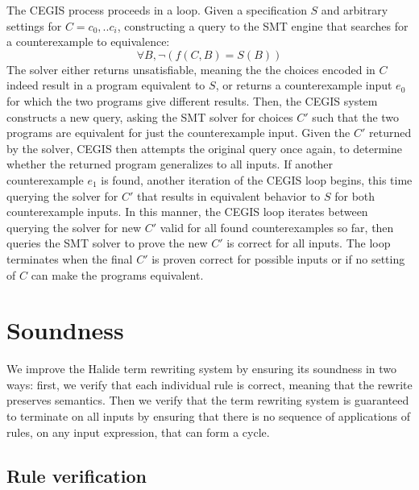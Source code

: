 \documentclass[sigplan,10pt,review,anonymous]{acmart}\settopmatter{printfolios=true,printccs=false,printacmref=false}
\begin{document}
The CEGIS process proceeds in a loop. Given a specification $S$ and arbitrary
settings for $C = {c_0,..c_i}$, constructing a query to the SMT engine that searches for
a counterexample to equivalence:
$$\forall B, \neg (f(C, B) = S(B))$$
The solver either returns unsatisfiable, meaning the the choices encoded in $C$
indeed result in a program equivalent to $S$, or returns a counterexample input $e_0$
for which the two programs give different results.  Then, the CEGIS system constructs a new query,
asking the SMT solver for choices $C'$ such that the two programs are equivalent for just the
counterexample input.
Given the $C'$ returned by the solver, CEGIS then attempts the original query once again, to
determine whether the returned program generalizes to all inputs.
If another counterexample $e_1$ is found, another iteration of the CEGIS loop begins, this time querying
the solver for $C'$ that results in equivalent behavior to $S$ for both counterexample inputs.
In this manner, the CEGIS loop iterates between querying the solver for new $C'$ valid
for all found counterexamples so far, then queries the SMT solver to prove the new $C'$ is
correct for all inputs.  The loop terminates when the final $C'$ is proven correct for
possible inputs or if no setting of $C$ can make the programs equivalent.

\section{Soundness}
\label{sec:soundness}

We improve the Halide term rewriting system by ensuring its soundness in
two ways: first, we verify that each individual rule is correct, meaning that the
rewrite preserves semantics. Then we verify that the term rewriting system is
guaranteed to terminate on all inputs by ensuring that there is no sequence of
applications of rules, on any input expression, that can form a cycle.

\subsection{Rule verification}
\end{document}
